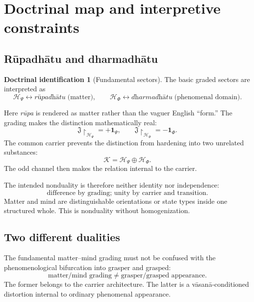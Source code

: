\documentclass[11pt,reqno]{scrartcl}
\newcommand{\scrK}{\mathscr K}
\newcommand{\scrHP}{\mathscr H_{\Psi}}
\newcommand{\scrHF}{\mathscr H_{\Phi}}
\newcommand{\fundJ}{\mathfrak J}
\newcommand{\idop}{\mathbf 1}
\newcommand{\restr}[2]{#1\!\upharpoonright_{#2}}
\theoremstyle{plain}
\theoremstyle{definition}
\newtheorem{identification}[identification]{Doctrinal identification}
\theoremstyle{remark}
\begin{document}
\section{Doctrinal map and interpretive constraints}
\label{sec:doctrinal-map}

\subsection{R\=upadh\=atu and dharmadh\=atu}

\begin{identification}[Fundamental sectors]
\label{id:fundamental-sectors}
The basic graded sectors are interpreted as
\begin{equation}
  \boxed{
  \scrHP\longleftrightarrow\textit{r\=upadh\=atu}\;\text{(matter)},
  \qquad
  \scrHF\longleftrightarrow\textit{dharmadh\=atu}\;\text{(phenomenal domain)}.}
  \label{eq:rupa-dharma}
\end{equation}
\end{identification}

Here \emph{r\=upa} is rendered as matter rather than the vaguer English
``form.''  The grading makes the distinction mathematically real:
\begin{equation}
  \fundJ\restr{}{\scrHP}=+\idop_{\Psi},
  \qquad
  \fundJ\restr{}{\scrHF}=-\idop_{\Phi}.
\end{equation}
The common carrier prevents the distinction from hardening into two unrelated
substances:
\begin{equation}
  \scrK=\scrHP\oplus\scrHF.
\end{equation}
The odd channel then makes the relation internal to the carrier.

The intended nonduality is therefore neither identity nor independence:
\begin{equation}
  \boxed{
  \text{difference by grading; unity by carrier and transition}.}
  \label{eq:nonduality-slogan}
\end{equation}
Matter and mind are distinguishable orientations or state types inside one
structured whole.  This is nonduality without homogenization.

\subsection{Two different dualities}

The fundamental matter--mind grading must not be confused with the
phenomenological bifurcation into grasper and grasped:
\begin{equation}
  \boxed{
  \text{matter/mind grading}
  \neq
  \text{grasper/grasped appearance}.}
  \label{eq:two-dualities}
\end{equation}
The former belongs to the carrier architecture.  The latter is a
v\=asan\=a-conditioned distortion internal to ordinary phenomenal appearance.
\end{document}
